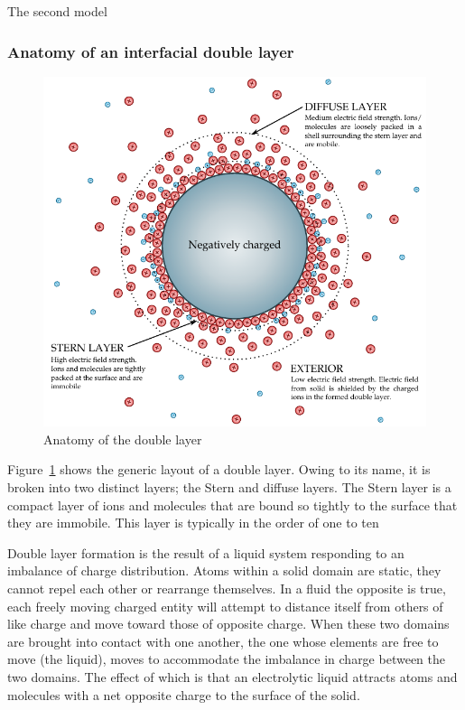     The second model



    

  \subsubsection*{Anatomy of an interfacial double layer}

    \begin{figure}
      \begin{center}
        \includegraphics{content/introduction/graphics/doubleLayer_labelled.pdf}
      \end{center}
      \caption{Anatomy of the double layer}
      \label{fig:doubleLayer_anatomy}
    \end{figure}

    Figure~\ref{fig:doubleLayer_anatomy} shows the generic layout of a double layer.
    Owing to its name, it is broken into two distinct layers; the Stern and diffuse layers.
    The Stern layer is a compact layer of ions and molecules that are bound so tightly to the surface that they are immobile.
    This layer is typically in the order of one to ten 

    Double layer formation is the result of a liquid system responding to an imbalance of charge distribution.
		Atoms within a solid domain are static, they cannot repel each other or rearrange themselves.
		In a fluid the opposite is true, each freely moving charged entity will attempt to distance itself from others of like charge and move toward those of opposite charge.
		When these two domains are brought into contact with one another, the one whose elements are free to move (the liquid), moves to accommodate the imbalance in charge between the two domains.
		The effect of which is that an electrolytic liquid attracts atoms and molecules with a net opposite charge to the surface of the solid.

